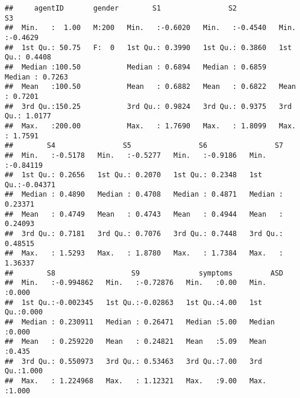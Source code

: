 \documentclass[]{article}
\newenvironment{Shaded}{\begin{snugshade}}{\end{snugshade}}
\newcommand{\KeywordTok}[1]{\textcolor[rgb]{0.13,0.29,0.53}{\textbf{#1}}}
\newcommand{\DecValTok}[1]{\textcolor[rgb]{0.00,0.00,0.81}{#1}}
\newcommand{\StringTok}[1]{\textcolor[rgb]{0.31,0.60,0.02}{#1}}
\newcommand{\CommentTok}[1]{\textcolor[rgb]{0.56,0.35,0.01}{\textit{#1}}}
\newcommand{\OperatorTok}[1]{\textcolor[rgb]{0.81,0.36,0.00}{\textbf{#1}}}
\newcommand{\NormalTok}[1]{#1}
\begin{document}
\begin{verbatim}
##     agentID       gender        S1                S2                S3         
##  Min.   :  1.00   M:200   Min.   :-0.6020   Min.   :-0.4540   Min.   :-0.4629  
##  1st Qu.: 50.75   F:  0   1st Qu.: 0.3990   1st Qu.: 0.3860   1st Qu.: 0.4408  
##  Median :100.50           Median : 0.6894   Median : 0.6859   Median : 0.7263  
##  Mean   :100.50           Mean   : 0.6882   Mean   : 0.6822   Mean   : 0.7201  
##  3rd Qu.:150.25           3rd Qu.: 0.9824   3rd Qu.: 0.9375   3rd Qu.: 1.0177  
##  Max.   :200.00           Max.   : 1.7690   Max.   : 1.8099   Max.   : 1.7591  
##        S4                S5                S6                S7          
##  Min.   :-0.5178   Min.   :-0.5277   Min.   :-0.9186   Min.   :-0.84119  
##  1st Qu.: 0.2656   1st Qu.: 0.2070   1st Qu.: 0.2348   1st Qu.:-0.04371  
##  Median : 0.4890   Median : 0.4708   Median : 0.4871   Median : 0.23371  
##  Mean   : 0.4749   Mean   : 0.4743   Mean   : 0.4944   Mean   : 0.24093  
##  3rd Qu.: 0.7181   3rd Qu.: 0.7076   3rd Qu.: 0.7448   3rd Qu.: 0.48515  
##  Max.   : 1.5293   Max.   : 1.8780   Max.   : 1.7384   Max.   : 1.36337  
##        S8                  S9              symptoms         ASD       
##  Min.   :-0.994862   Min.   :-0.72876   Min.   :0.00   Min.   :0.000  
##  1st Qu.:-0.002345   1st Qu.:-0.02863   1st Qu.:4.00   1st Qu.:0.000  
##  Median : 0.230911   Median : 0.26471   Median :5.00   Median :0.000  
##  Mean   : 0.259220   Mean   : 0.24821   Mean   :5.09   Mean   :0.435  
##  3rd Qu.: 0.550973   3rd Qu.: 0.53463   3rd Qu.:7.00   3rd Qu.:1.000  
##  Max.   : 1.224968   Max.   : 1.12321   Max.   :9.00   Max.   :1.000
\end{verbatim}

\begin{Shaded}
\end{Shaded}
\end{document}
